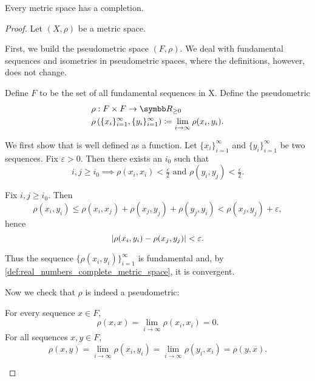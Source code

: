 \begin{theorem}\label{thm:metric_space_completion_existence}
  Every metric space has a completion.
\end{theorem}
\begin{proof}
  Let \( (X, \rho) \) be a metric space.

  \begin{defenum}
     First, we build the pseudometric space \( (F, \rho) \). We deal with fundamental sequences and isometries in pseudometric spaces, where the definitions, however, does not change.

     Define \( F \) to be the set of all fundamental sequences in X. Define the pseudometric
    \begin{align*}
      &\rho: F \times F \to \R_{\geq 0} \\
      &\rho\left( \{ x_i \}_{i=1}^\infty, \{ y_i \}_{i=1}^\infty \right) \coloneqq \lim_{i \to \infty} \rho(x_i, y_i).
    \end{align*}

    We first show that is well defined as a function. Let \( \{ x_i \}_{i=1}^\infty \) and \( \{ y_i \}_{i=1}^\infty \) be two sequences. Fix \( \varepsilon > 0 \). Then there exists an \( i_0 \) such that
    \begin{equation*}
      i, j \geq i_0 \implies \rho(x_i, x_i) < \tfrac \varepsilon 2 \text{ and } \rho(y_i, y_j) < \tfrac \varepsilon 2.
    \end{equation*}

    Fix \( i, j \geq i_0 \). Then
    \begin{equation*}
      \rho(x_i, y_i) \leq \rho(x_i, x_j) + \rho(x_j, y_j) + \rho(y_j, y_i) < \rho(x_j, y_j) + \varepsilon,
    \end{equation*}
    hence
    \begin{equation*}
      \left\vert \rho(x_i, y_i) - \rho(x_j, y_j) \right\vert < \varepsilon.
    \end{equation*}

    Thus the sequence \( \{ \rho(x_i, y_i) \}_{i=1}^\infty \) is fundamental and, by \cref{def:real_numbers_complete_metric_space}, it is convergent.

    Now we check that \( \rho \) is indeed a pseudometric:
    \begin{description}
       For every sequence \( x \in F \),
      \begin{equation*}
        \rho(x, x) = \lim_{i \to \infty} \rho(x_i, x_i) = 0.
      \end{equation*}
       For all sequences \( x, y \in F \),
      \begin{equation*}
        \rho(x, y) = \lim_{i \to \infty} \rho(x_i, y_i) = \lim_{i \to \infty} \rho(y_i, x_i) = \rho(y, x).
      \end{equation*}


\end{description}
\end{defenum}
\end{proof}
